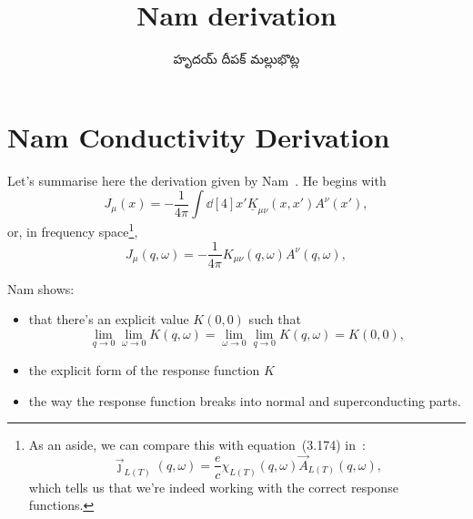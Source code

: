 \documentclass[../main.tex]{subfiles}
\title{Nam derivation}
\author{\begin{telugu}హృదయ్ దీపక్ మల్లుభొట్ల\end{telugu}}
\date{}
\begin{document}
	\onlyinsubfile{\maketitle}
	\section{Nam Conductivity Derivation} \label{sec:Nam}
	Let's summarise here the derivation given by Nam~\autocite{Nam1967}.
	He begins with
	\begin{equation}
		J_\mu(x) = - \frac{1}{4\pi}\int \dd[4]{x'} \underline{K}_{\mu\nu}(x, x') A^\nu(x'),
	\end{equation}
	or, in frequency space\footnote{
		As an aside, we can compare this with equation~(3.174) in~\autocite{Giuliani2005}:
		\begin{equation*}
			\vec{\jmath}_{L(T)}(q, \omega) = \frac{e}{c} \chi_{L(T)}(q, \omega) \vec{A}_{L(T)}(q, \omega),
		\end{equation*}
		which tells us that we're indeed working with the correct response functions.
	},
	\begin{equation}
		J_\mu(q, \omega) = - \frac{1}{4\pi} K_{\mu\nu}(q, \omega) A^\nu(q, \omega),
	\end{equation}

	Nam shows:
	\begin{itemize}
		\item that there's an explicit value $K(0, 0)$ such that
			\begin{equation}
				\lim_{q \rightarrow 0} \lim_{\omega \rightarrow 0} K(q, \omega) = \lim_{\omega \rightarrow 0} \lim_{q \rightarrow 0} K(q, \omega) = K(0, 0),
			\end{equation}
		\item the explicit form of the response function $K$
		\item the way the response function breaks into normal and superconducting parts.
	\end{itemize}
\end{document}
